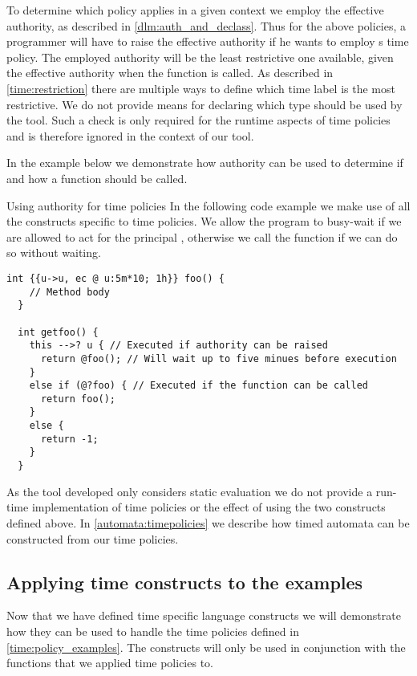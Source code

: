To determine which policy applies in a given context we employ the effective authority, as described in \cref{dlm:auth_and_declass}.
Thus for the above policies, a programmer will have to raise the effective authority if he wants to employ s time policy.
The employed authority will be the least restrictive one available, given the effective authority when the function is called.
As described in \cref{time:restriction} there are multiple ways to define which time label is the most restrictive.
We do not provide means for declaring which type should be used by the tool.
Such a check is only required for the runtime aspects of time policies and is therefore ignored in the context of our tool.

In the example below we demonstrate how authority can be used to determine if and how a function should be called.

\begin{minipage}{\linewidth}
\begin{example}{Using authority for time policies}\label{time:complexcall}
In the following code example we make use of all the constructs specific to time policies.
We allow the program to busy-wait if we are allowed to act for the principal , otherwise we call the function  if we can do so without waiting.
\begin{lstlisting}[style=dlmc]
  int {{u->u, ec @ u:5m*10; 1h}} foo() {
    // Method body
  }

  int getfoo() {
    this -->? u { // Executed if authority can be raised
      return @foo(); // Will wait up to five minues before execution
    }
    else if (@?foo) { // Executed if the function can be called
      return foo();
    }
    else {
      return -1;
    }
  }
\end{lstlisting}
\end{example}
\end{minipage}

As the tool developed only considers static evaluation we do not provide a run-time implementation of time policies or the effect of using the two constructs defined above.
In \cref{automata:timepolicies} we describe how timed automata can be constructed from our time policies.

\subsection{Applying time constructs to the examples}\label{time:construct_examples}
Now that we have defined time specific language constructs we will demonstrate how they can be used to handle the time policies defined in \cref{time:policy_examples}.
The constructs will only be used in conjunction with the functions that we applied time policies to.

